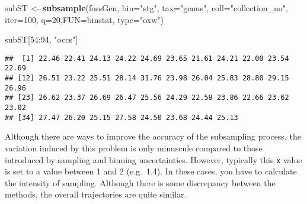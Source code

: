 \documentclass[]{article}
\newenvironment{Shaded}{\begin{snugshade}}{\end{snugshade}}
\newcommand{\KeywordTok}[1]{\textcolor[rgb]{0.13,0.29,0.53}{\textbf{{#1}}}}
\newcommand{\DataTypeTok}[1]{\textcolor[rgb]{0.13,0.29,0.53}{{#1}}}
\newcommand{\DecValTok}[1]{\textcolor[rgb]{0.00,0.00,0.81}{{#1}}}
\newcommand{\StringTok}[1]{\textcolor[rgb]{0.31,0.60,0.02}{{#1}}}
\newcommand{\NormalTok}[1]{{#1}}
\begin{document}
\begin{Shaded}
\begin{Highlighting}[]
\NormalTok{subST <-}\StringTok{ }\KeywordTok{subsample}\NormalTok{(fossGen, }\DataTypeTok{bin=}\StringTok{"stg"}\NormalTok{, }\DataTypeTok{tax=}\StringTok{"genus"}\NormalTok{, }\DataTypeTok{coll=}\StringTok{"collection_no"}\NormalTok{, }
  \DataTypeTok{iter=}\DecValTok{100}\NormalTok{, }\DataTypeTok{q=}\DecValTok{20}\NormalTok{,}\DataTypeTok{FUN=}\NormalTok{binstat, }\DataTypeTok{type=}\StringTok{"oxw"}\NormalTok{)}
\end{Highlighting}
\end{Shaded}

\begin{Shaded}
\begin{Highlighting}[]
\NormalTok{subST[}\DecValTok{54}\NormalTok{:}\DecValTok{94}\NormalTok{, }\StringTok{"occs"}\NormalTok{]}
\end{Highlighting}
\end{Shaded}

\begin{verbatim}
##  [1] 22.46 22.41 24.13 24.22 24.69 23.65 21.61 24.21 22.00 23.54 22.69
## [12] 26.51 23.22 25.51 28.14 31.76 23.98 26.04 25.83 28.80 29.15 26.96
## [23] 26.62 23.37 26.69 26.47 25.56 24.29 22.58 23.86 22.66 23.62 23.02
## [34] 27.47 26.20 25.15 27.58 24.50 23.68 24.44 25.13
\end{verbatim}

Although there are ways to improve the accuracy of the subsampling
process, the variation induced by this problem is only minuscule
compared to those introduced by sampling and binning uncertainties.
However, typically this \texttt{x} value is set to a value between 1 and
2 (e.g.~1.4). In these cases, you have to calculate the intensity of
sampling. Although there is some discrepancy between the methods, the
overall trajectories are quite similar.
\end{document}
